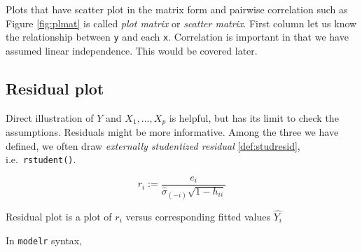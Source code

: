 \documentclass[]{book}
\newenvironment{Shaded}{\begin{snugshade}}{\end{snugshade}}
\newcommand{\CommentTok}[1]{\textcolor[rgb]{0.56,0.35,0.01}{\textit{#1}}}
\newcommand{\ControlFlowTok}[1]{\textcolor[rgb]{0.13,0.29,0.53}{\textbf{#1}}}
\newcommand{\DataTypeTok}[1]{\textcolor[rgb]{0.13,0.29,0.53}{#1}}
\newcommand{\DecValTok}[1]{\textcolor[rgb]{0.00,0.00,0.81}{#1}}
\newcommand{\KeywordTok}[1]{\textcolor[rgb]{0.13,0.29,0.53}{\textbf{#1}}}
\newcommand{\NormalTok}[1]{#1}
\newcommand{\OperatorTok}[1]{\textcolor[rgb]{0.81,0.36,0.00}{\textbf{#1}}}
\newcommand{\StringTok}[1]{\textcolor[rgb]{0.31,0.60,0.02}{#1}}
\theoremstyle{definition}
\theoremstyle{definition}
\theoremstyle{definition}
\theoremstyle{remark}
\let\BeginKnitrBlock\begin \let\EndKnitrBlock\end
\begin{document}
Plots that have scatter plot in the matrix form and pairwise correlation such as Figure \ref{fig:plmat} is called \emph{plot matrix} or \emph{scatter matrix}. First column let us know the relationship between \texttt{y} and each \texttt{x}. Correlation is important in that we have assumed linear independence. This would be covered later.

\hypertarget{residual-plot}{%
\subsection{Residual plot}\label{residual-plot}}

Direct illustration of \(Y\) and \(X_1, \ldots, X_p\) is helpful, but has its limit to check the assumptions. Residuals might be more informative. Among the three we have defined, we often draw \emph{externally studentized residual} \ref{def:studresid}, i.e.~\texttt{rstudent()}.

\[r_i := \frac{e_i}{\hat\sigma_{(-i)} \sqrt{1 - h_{ii}}}\]

\BeginKnitrBlock{definition}[Residual plot]
\protect\hypertarget{def:residplot}{}{\label{def:residplot} {} }Residual plot is a plot of \(r_i\) versus corresponding fitted values \(\hat{Y_i}\)
\EndKnitrBlock{definition}

In \texttt{modelr} syntax,

\begin{Shaded}
\end{Shaded}
\end{document}
